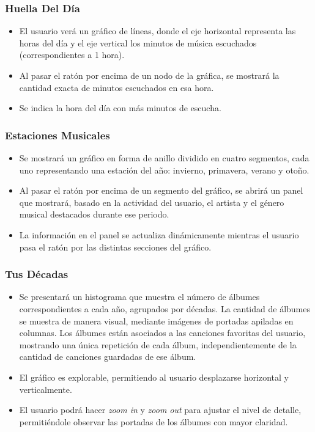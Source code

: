 \subsubsection*{Huella Del Día}

\begin{itemize}
    \item El usuario verá un gráfico de líneas, donde el eje horizontal representa las horas del día y el eje vertical los minutos de música escuchados (correspondientes a 1 hora).
    \item Al pasar el ratón por encima de un nodo de la gráfica, se mostrará la cantidad exacta de minutos escuchados en esa hora.
    \item Se indica la hora del día con más minutos de escucha.
\end{itemize}

\subsubsection*{Estaciones Musicales}

\begin{itemize}
    \item Se mostrará un gráfico en forma de anillo dividido en cuatro segmentos, cada uno representando una estación del año: invierno, primavera, verano y otoño.
    \item Al pasar el ratón por encima de un segmento del gráfico, se abrirá un panel que mostrará, basado en la actividad del usuario, el artista y el género musical destacados durante ese periodo.
    \item La información en el panel se actualiza dinámicamente mientras el usuario pasa el ratón por las distintas secciones del gráfico.
\end{itemize}

\subsubsection*{Tus Décadas}

\begin{itemize}
    \item Se presentará un histograma que muestra el número de álbumes correspondientes a cada año, agrupados por décadas. La cantidad de álbumes se muestra de manera visual, mediante imágenes de portadas apiladas en columnas. Los álbumes están asociados a las canciones favoritas del usuario, mostrando una única repetición de cada álbum, independientemente de la cantidad de canciones guardadas de ese álbum.
    \item El gráfico es explorable, permitiendo al usuario desplazarse horizontal y verticalmente.
    \item El usuario podrá hacer \textit{zoom in} y \textit{zoom out} para ajustar el nivel de detalle, permitiéndole observar las portadas de los álbumes con mayor claridad.
\end{itemize}

